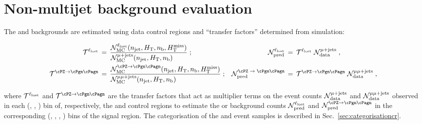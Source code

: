 
\section{Non-multijet background evaluation}
\label{sec:ewk}

The \lost and \znunuj backgrounds are estimated using data control
regions and ``transfer factors'' determined from simulation: 

\begin{align}
  \tf^{\lost} \, & = \,
  \frac{\mathcal{N}^{\lost}_\textrm{MC}(\njet, \scalht, \nb, \mht)}
  {\mathcal{N}^{\mj}_\textrm{MC}(\njet, \scalht, \nb)\hfill} \; ;
  & 
  \mathcal{N}^{\lost}_\textrm{pred} \, & = \,
  \tf^{\lost} \; \mathcal{N}^{\mj}_\textrm{data} \; ,
  \\
  \tf^{\znunu} \, & = \,
  \frac{\mathcal{N}^{\znunu}_\textrm{MC}(\njet, \scalht, \nb, \mht)}
  {\mathcal{N}^{\mmj}_\textrm{MC}(\njet, \scalht, \nb)\hfill} \; ;
  & 
  \mathcal{N}^\textrm{\znunu}_\textrm{pred} \, & = \,
  \tf^{\znunu} \; \mathcal{N}^{\mmj}_\textrm{data} \; ,
\end{align}

where $\mathcal{T}^{\ell_\textrm{lost}}$ and $\tf^{\znunu}$ are the transfer factors that
act as multiplier terms on the event counts
$\mathcal{N}^{\mu + \text{jets}}_\textrm{data}$ and
$\mathcal{N}^{\mu\mu + \text{jets}}_\textrm{data}$ observed in each (\njet, \scalht,
\nb) bin of, respectively, the \mj and \mmj control regions to
estimate the \lost or \znunuj background counts
$\mathcal{N}^{\ell_\textrm{lost}}_\textrm{pred}$ and
$\mathcal{N}^{\znunu}_\textrm{pred}$ in the corresponding (\njet,
\scalht, \nb, \mht) bins of the signal region. The categorisation of
the \mj and \mmj event samples is described in
Sec.~\ref{sec:categorisationcr}.

